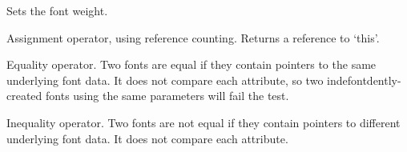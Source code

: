 



\label{wxfontsetweight}


Sets the font weight.





\label{wxfontassignment}


Assignment operator, using reference counting. Returns a reference
to `this'.

\label{wxfontequals}


Equality operator. Two fonts are equal if they contain pointers
to the same underlying font data. It does not compare each attribute,
so two indefontdently-created fonts using the same parameters will
fail the test.

\label{wxfontnotequals}


Inequality operator. Two fonts are not equal if they contain pointers
to different underlying font data. It does not compare each attribute.


